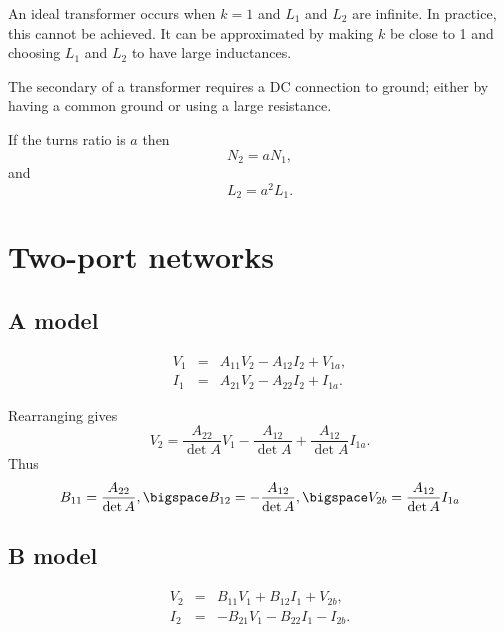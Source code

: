 \documentclass[a4paper, 12pt]{article}
\begin{document}
An ideal transformer occurs when $k=1$ and $L_1$ and $L_2$ are
infinite.  In practice, this cannot be achieved.  It can be
approximated by making $k$ be close to 1 and choosing $L_1$ and $L_2$
to have large inductances.


The secondary of a transformer requires a DC connection to ground;
either by having a common ground or using a large resistance.

If the turns ratio is $a$ then
%
\begin{equation}
N_2 = a N_1,
\end{equation}
%
and
%
\begin{equation}
  L_2 = a^2 L_1.
\end{equation}



\section{Two-port networks}


\subsection{A model}

\begin{eqnarray}
  V_1 & = & A_{11} V_2 - A_{12} I_2 + V_{1a}, \\
  I_1 & = & A_{21} V_2 - A_{22} I_2 + I_{1a}.
\end{eqnarray}

Rearranging gives
%
\begin{equation}
 V_2 = \frac{A_{22}}{\det{A}} V_1 - \frac{A_{12}}{\det{A}} + \frac{A_{12}}{\det{A}} I_{1a}. 
\end{equation}
%
Thus
%
\begin{equation}
 B_{11} = \frac{A_{22}}{\det{A}}, \bigspace B_{12} = -\frac{A_{12}}{\det{A}}, \bigspace V_{2b} = \frac{A_{12}}{\det{A}} I_{1a} 
\end{equation}


\subsection{B model}

\begin{eqnarray}
\label{eqn:BV2}
  V_2 & = & B_{11} V_1 + B_{12} I_1 + V_{2b}, \\
  I_2 & = & -B_{21} V_1 - B_{22} I_1 - I_{2b}.
\label{eqn:BI2}
\end{eqnarray}
\end{document}
